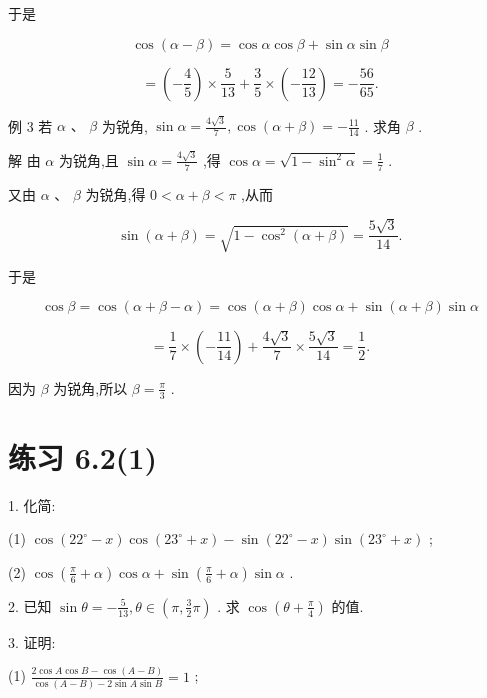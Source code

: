\documentclass[10pt]{article}
\begin{document}
于是

\[
\cos \left( {\alpha  - \beta }\right)  = \cos \alpha \cos \beta  + \sin \alpha \sin \beta
\]

\[
= \left( {-\frac{4}{5}}\right)  \times  \frac{5}{13} + \frac{3}{5} \times  \left( {-\frac{12}{13}}\right)  =  - \frac{56}{65}.
\]

例 3 若 \(\alpha \text{ 、 }\beta\) 为锐角, \(\sin \alpha  = \frac{4\sqrt{3}}{7},\cos \left( {\alpha  + \beta }\right)  =  - \frac{11}{14}\) . 求角 \(\beta\) .

解 由 \(\alpha\) 为锐角,且 \(\sin \alpha  = \frac{4\sqrt{3}}{7}\) ,得 \(\cos \alpha  = \sqrt{1 - {\sin }^{2}\alpha } = \frac{1}{7}\) .

又由 \(\alpha \text{ 、 }\beta\) 为锐角,得 \(0 < \alpha  + \beta  < \pi\) ,从而

\[
\sin \left( {\alpha  + \beta }\right)  = \sqrt{1 - {\cos }^{2}\left( {\alpha  + \beta }\right) } = \frac{5\sqrt{3}}{14}.
\]

于是

\[
\cos \beta  = \cos \left( {\alpha  + \beta  - \alpha }\right)  = \cos \left( {\alpha  + \beta }\right) \cos \alpha  + \sin \left( {\alpha  + \beta }\right) \sin \alpha
\]

\[
= \frac{1}{7} \times  \left( {-\frac{11}{14}}\right)  + \frac{4\sqrt{3}}{7} \times  \frac{5\sqrt{3}}{14} = \frac{1}{2}.
\]

因为 \(\beta\) 为锐角,所以 \(\beta  = \frac{\pi }{3}\) .

\section*{练习 6.2(1)}

1. 化简:

(1) \(\cos \left( {{22}^{ \circ  } - x}\right) \cos \left( {{23}^{ \circ  } + x}\right)  - \sin \left( {{22}^{ \circ  } - x}\right) \sin \left( {{23}^{ \circ  } + x}\right)\) ;

(2) \(\cos \left( {\frac{\pi }{6} + \alpha }\right) \cos \alpha  + \sin \left( {\frac{\pi }{6} + \alpha }\right) \sin \alpha\) .

2. 已知 \(\sin \theta  =  - \frac{5}{13},\theta  \in  \left( {\pi ,\frac{3}{2}\pi }\right)\) . 求 \(\cos \left( {\theta  + \frac{\pi }{4}}\right)\) 的值.

3. 证明:

(1) \(\frac{2\cos A\cos B - \cos \left( {A - B}\right) }{\cos \left( {A - B}\right)  - 2\sin A\sin B} = 1\) ;
\end{document}
